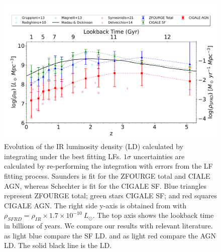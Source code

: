 \begin{figure}[h]
    \centering
    \includegraphics[width=\textwidth]{Figures/SFRD.png}
    \caption{Evolution of the IR luminosity density (LD) calculated by integrating under the best fitting LFs. $1\sigma$ uncertainties are calculated by re-performing the integration with errors from the LF fitting process. Saunders is fit for the ZFOURGE total and CIALE AGN, whereas Schechter is fit for the CIGALE SF. Blue triangles represent ZFOURGE total; green stars CIGALE SF; and red squares CIGALE AGN. The right side y-axis is obtained from \cite{kennicutt_global_1998} with $\rho_{SFRD} = \rho_{IR} \times 1.7\times10^{-10} \ L_{\odot}$. The top axis shows the lookback time in billions of years. We compare our results with relevant literature. \cite{gruppioni_herschel_2013, rodighiero_mid-_2010, magnelli_deepest_2013} as light blue compare the SF LD. \cite{symeonidis_agn_2021} and \cite{delvecchio_tracing_2014} as light red compare the AGN LD. The solid black line is the \cite{madau_cosmic_2014} LD.}
    \label{Fig: SFRD}
\end{figure}

